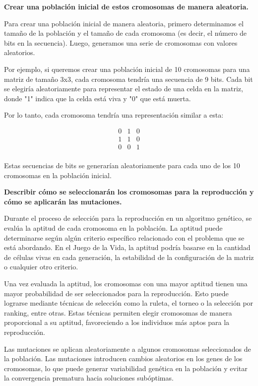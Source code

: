 \textbf{Crear una población inicial de estos cromosomas de manera aleatoria.}

Para crear una población inicial de manera aleatoria, primero determinamos el tamaño de la población y el tamaño de cada cromosoma (es decir, el número de bits en la secuencia). Luego, generamos una serie de cromosomas con valores aleatorios.

Por ejemplo, si queremos crear una población inicial de 10 cromosomas para una matriz de tamaño 3x3, cada cromosoma tendría una secuencia de 9 bits. Cada bit se elegiría aleatoriamente para representar el estado de una celda en la matriz, donde "1" indica que la celda está viva y "0" que está muerta.

Por lo tanto, cada cromosoma tendría una representación similar a esta:

\[
\begin{matrix}
0 & 1 & 0 \\
1 & 1 & 0 \\
0 & 0 & 1 \\
\end{matrix}
\]

Estas secuencias de bits se generarían aleatoriamente para cada uno de los 10 cromosomas en la población inicial.

\textbf{Describir cómo se seleccionarán los cromosomas para la reproducción y cómo se aplicarán las mutaciones.}

Durante el proceso de selección para la reproducción en un algoritmo genético, se evalúa la aptitud de cada cromosoma en la población. La aptitud puede determinarse según algún criterio específico relacionado con el problema que se está abordando. En el Juego de la Vida, la aptitud podría basarse en la cantidad de células vivas en cada generación, la estabilidad de la configuración de la matriz o cualquier otro criterio.

Una vez evaluada la aptitud, los cromosomas con una mayor aptitud tienen una mayor probabilidad de ser seleccionados para la reproducción. Esto puede lograrse mediante técnicas de selección como la ruleta, el torneo o la selección por ranking, entre otras. Estas técnicas permiten elegir cromosomas de manera proporcional a su aptitud, favoreciendo a los individuos más aptos para la reproducción.

Las mutaciones se aplican aleatoriamente a algunos cromosomas seleccionados de la población. Las mutaciones introducen cambios aleatorios en los genes de los cromosomas, lo que puede generar variabilidad genética en la población y evitar la convergencia prematura hacia soluciones subóptimas. 

